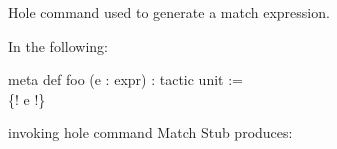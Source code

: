 \documentclass{article}
\begin{document}
\par
Hole command used to generate a 
\colorbox[RGB]{253,246,227}{{{{\color[RGB]{133, 153, 0} match }}}} expression.
\par
In the following:
\\
\colorbox[RGB]{253,246,227}{\parbox{4.5in}{{{{\color[RGB]{133, 153, 0} meta }}}{{{\color[RGB]{101, 123, 131}   }}}{{{\color[RGB]{133, 153, 0} def }}}{{{\color[RGB]{101, 123, 131}   }}}{{{\color[RGB]{211, 54, 130} foo }}}{{{\color[RGB]{101, 123, 131}   }}}{{{\color[RGB]{101, 123, 131} (e : expr) : tactic unit  }}}{{{\color[RGB]{181, 137, 0} := }}}{{{\color[RGB]{101, 123, 131} 
 }}}\\
{{{\color[RGB]{101, 123, 131} \{! e !\}
 }}}\\

}}\par
invoking hole command 
\colorbox[RGB]{253,246,227}{{{{\color[RGB]{101, 123, 131} Match Stub }}}} produces:
\\
\end{document}
